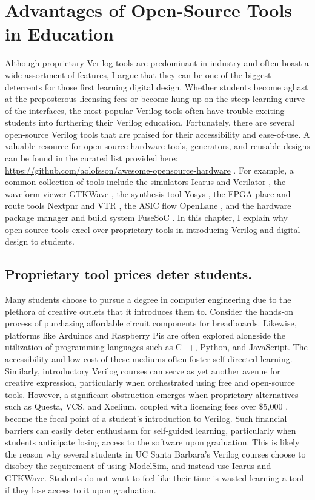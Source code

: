 
\chapter{Advantages of Open-Source Tools in Education}
\label{chapter:open_source_tools}

Although proprietary Verilog tools are predominant in industry and often boast a wide assortment of features, I argue that they can be one of the biggest deterrents for those first learning digital design. Whether students become aghast at the preposterous licensing fees or become hung up on the steep learning curve of the interfaces, the most popular Verilog tools often have trouble exciting students into furthering their Verilog education. Fortunately, there are several open-source Verilog tools that are praised for their accessibility and ease-of-use. A valuable resource for open-source hardware tools, generators, and reusable designs can be found in the curated list provided here: \url{https://github.com/aolofsson/awesome-opensource-hardware} \cite{awesomeOpenSourceHardware}. For example, a common collection of tools include the simulators Icarus \cite{icarusGitHub} and Verilator \cite{verilatorGitHub}, the waveform viewer GTKWave \cite{gtkwaveGitHub}, the synthesis tool Yosys \cite{yosysGitHub}, the FPGA place and route tools Nextpnr \cite{nextpnrGitHub} and VTR \cite{vtrGitHub}, the ASIC flow OpenLane \cite{OpenLaneGitHub}, and the hardware package manager and build system FuseSoC \cite{fusesocGitHub, edalizeGitHub}. In this chapter, I explain why open-source tools excel over proprietary tools in introducing Verilog and digital design to students.

\section{Proprietary tool prices deter students.}

Many students choose to pursue a degree in computer engineering due to the plethora of creative outlets that it introduces them to. Consider the hands-on process of purchasing affordable circuit components for breadboards. Likewise, platforms like Arduinos and Raspberry Pis are often explored alongside the utilization of programming languages such as C++, Python, and JavaScript. The accessibility and low cost of these mediums often foster self-directed learning. Similarly, introductory Verilog courses can serve as yet another avenue for creative expression, particularly when orchestrated using free and open-source tools. However, a significant obstruction emerges when proprietary alternatives such as Questa, VCS, and Xcelium, coupled with licensing fees over \$5,000 \cite{olofssonLatchUp, licensePricesReddit}, become the focal point of a student's introduction to Verilog. Such financial barriers can easily deter enthusiasm for self-guided learning, particularly when students anticipate losing access to the software upon graduation. This is likely the reason why several students in UC Santa Barbara's Verilog courses choose to disobey the requirement of using ModelSim, and instead use Icarus and GTKWave. Students do not want to feel like their time is wasted learning a tool if they lose access to it upon graduation.


